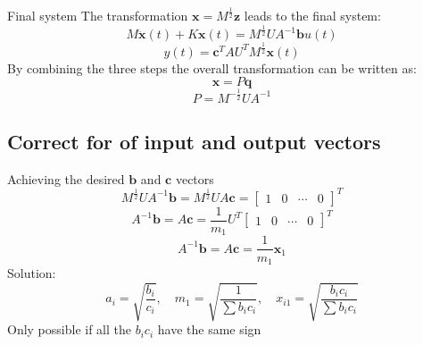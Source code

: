 \documentclass{beamer}
\begin{document}
\begin{frame}{Final system}
The transformation $\mathbf{x} = M^{\frac{1}{2}} \mathbf{z}$ leads to the final system:
\begin{equation}
M \ddot{\mathbf{x}}(t) + K \mathbf{x}(t) = M^{\frac{1}{2}} U A^{-1} \mathbf{b} u(t)
\label{eq:fin1}
\end{equation}
\begin{equation}
y(t) = \mathbf{c}^T  A U^T M^{\frac{1}{2}}\mathbf{x}(t)
\label{eq:fin2}
\end{equation}
By combining the three steps the overall transformation can be written as:
\begin{equation}
\mathbf{x} = P \mathbf{q}
\end{equation}
\begin{equation}
P =  M^{-\frac{1}{2}} U A^{-1}
\label{eq:p}
\end{equation}
\end{frame}

\subsection{Correct for of input and output vectors}
\begin{frame}{Achieving the desired $\mathbf{b}$ and $\mathbf{c}$ vectors}
\begin{equation}
M^{\frac{1}{2}} U A^{-1} \mathbf{b} = M^{\frac{1}{2}} U A \mathbf{c} = \begin{bmatrix} 1 &  0 & \cdots & 0 \end{bmatrix}^T
\end{equation}
\begin{equation}
A^{-1} \mathbf{b} = A \mathbf{c} = \frac{1}{m_1} U^T \begin{bmatrix} 1 &  0 & \cdots & 0 \end{bmatrix}^T
\end{equation}
\begin{equation}
A^{-1} \mathbf{b} = A \mathbf{c} = \frac{1}{m_1} \mathbf{x}_1
\label{eq:bc2}
\end{equation}
Solution:
\begin{equation}
a_i = \sqrt{\frac{b_i}{c_i}} ,\quad m_1 = \sqrt{\frac{1}{\sum b_i c_i}} ,\quad x_{i1} = \sqrt{\frac{b_i c_i}{\sum b_i c_i}}
\label{eq:bcxm}
\end{equation}
Only possible if all the $b_i c_i$ have the same sign
\end{frame}

\end{document}
